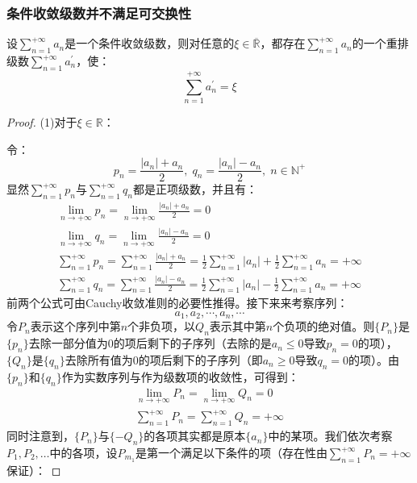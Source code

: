 \subsubsection{条件收敛级数并不满足可交换性}
\begin{theorem}
	设$\sum\limits_{n=1}^{+\infty}a_n$是一个条件收敛级数，则对任意的$\xi\in\overline{\mathbb{R}}$，都存在$\sum\limits_{n=1}^{+\infty}a_n$的一个重排级数$\sum\limits_{n=1}^{+\infty}a^{'}_n$，使：
	\begin{equation*}
		\sum_{n=1}^{+\infty}a^{'}_n=\xi
	\end{equation*}
\end{theorem}
\begin{proof}
	(1)对于$\xi\in\mathbb{R}$：\par
	令：
	\begin{equation*}
		p_n=\frac{|a_n|+a_n}{2},\;q_n=\frac{|a_n|-a_n}{2},\;n\in\mathbb{N}^+
	\end{equation*}
	显然$\sum\limits_{n=1}^{+\infty}p_n$与$\sum\limits_{n=1}^{+\infty}q_n$都是正项级数，并且有：
	\begin{gather*}
		\lim_{n\to+\infty}p_n=\lim_{n\to+\infty}\frac{|a_n|+a_n}{2}=0 \\
		\lim_{n\to+\infty}q_n=\lim_{n\to+\infty}\frac{|a_n|-a_n}{2}=0 \\
		\sum_{n=1}^{+\infty}p_n=\sum_{n=1}^{+\infty}\frac{|a_n|+a_n}{2}=\frac{1}{2}\sum_{n=1}^{+\infty}|a_n|+\frac{1}{2}\sum_{n=1}^{+\infty}a_n=+\infty \\
		\sum_{n=1}^{+\infty}q_n=\sum_{n=1}^{+\infty}\frac{|a_n|-a_n}{2}=\frac{1}{2}\sum_{n=1}^{+\infty}|a_n|-\frac{1}{2}\sum_{n=1}^{+\infty}a_n=+\infty
	\end{gather*}
	前两个公式可由Cauchy收敛准则的必要性推得。接下来来考察序列：
	\begin{equation*}
		a_1,a_2,\cdots,a_n,\cdots
	\end{equation*}
	令$P_n$表示这个序列中第$n$个非负项，以$Q_n$表示其中第$n$个负项的绝对值。则$\{P_n\}$是$\{p_n\}$去除一部分值为$0$的项后剩下的子序列（去除的是$a_n\leqslant0$导致$p_n=0$的项），$\{Q_n\}$是$\{q_n\}$去除所有值为$0$的项后剩下的子序列（即$a_n\geqslant0$导致$q_n=0$的项）。由$\{p_n\}$和$\{q_n\}$作为实数序列与作为级数项的收敛性，可得到：
	\begin{gather*}
		\lim_{n\to+\infty}P_n=\lim_{n\to+\infty}Q_n=0 \\
		\sum_{n=1}^{+\infty}P_n=\sum_{n=1}^{+\infty}Q_n=+\infty
	\end{gather*}
	同时注意到，$\{P_n\}$与$\{-Q_n\}$的各项其实都是原本$\{a_n\}$中的某项。我们依次考察$P_1,P_2,\dots$中的各项，设$P_{m_1}$是第一个满足以下条件的项（存在性由$\sum\limits_{n=1}^{+\infty}P_n=+\infty$保证）：

\end{proof}
